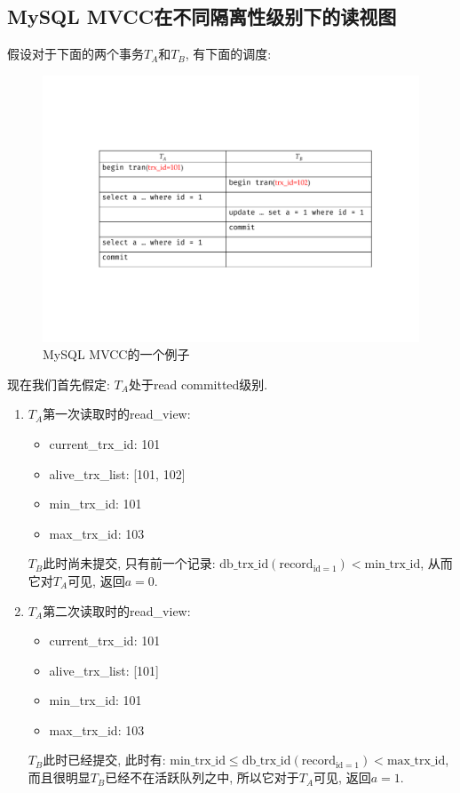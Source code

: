 \subsection{MySQL MVCC在不同隔离性级别下的读视图}

假设对于下面的两个事务$T_A$和$T_B$, 有下面的调度:
\begin{figure}[H]
    \centering
    \includegraphics[width=.7\textwidth]{figure/MVCC-shiwu.pdf}
    \caption{MySQL MVCC的一个例子}
\end{figure}

现在我们首先假定: $T_A$处于read committed级别.

\begin{enumerate}
    \item $T_A$第一次读取时的read\_view:
    \begin{itemize}
      \item current\_trx\_id: 101
      \item alive\_trx\_list: [101, 102]
      \item min\_trx\_id: 101
      \item max\_trx\_id: 103
    \end{itemize}
    $T_B$此时尚未提交, 只有前一个记录: $\text{db\_trx\_id}(\text{record}_{\text{id}=1})<\text{min\_trx\_id}$, 从而它对$T_A$可见, 返回$a=0$.
    \item $T_A$第二次读取时的read\_view:
    \begin{itemize}
      \item current\_trx\_id: 101
      \item alive\_trx\_list: [101]
      \item min\_trx\_id: 101
      \item max\_trx\_id: 103
    \end{itemize}
    $T_B$此时已经提交, 此时有: $\text{min\_trx\_id}\leq \text{db\_trx\_id}(\text{record}_{\text{id}=1})<\text{max\_trx\_id}$, 而且很明显$T_B$已经不在活跃队列之中, 所以它对于$T_A$可见, 返回$a=1$.
\end{enumerate}

